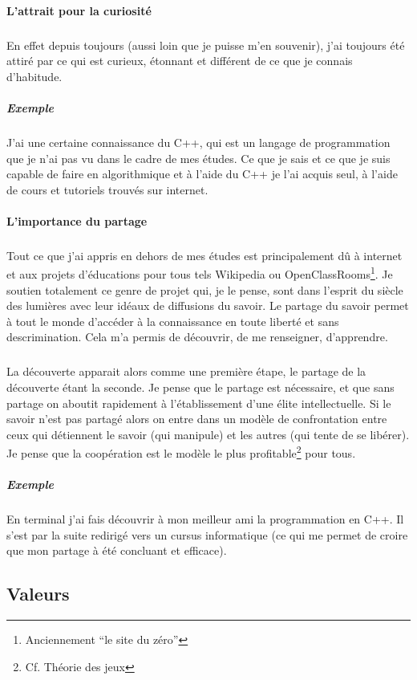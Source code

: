 \documentclass[a4paper,12pt, draft]{report}
\begin{document}
\paragraph{L'attrait pour la curiosité}
\subparagraph{}
En effet depuis toujours (aussi loin que je puisse m'en souvenir), j'ai toujours été attiré par ce qui est curieux, étonnant et différent de ce que je connais d'habitude.
\subparagraph{Exemple}
J'ai une certaine connaissance du C++, qui est un langage de programmation que je n'ai pas vu dans le cadre de mes études.  Ce que je sais et ce que je suis capable de faire en algorithmique et à l'aide du C++ je l'ai acquis seul, à l'aide de cours et tutoriels trouvés sur internet. 

 

\paragraph{L'importance du partage}
\subparagraph{}
Tout ce que j'ai appris en dehors de mes études est principalement dû à internet et aux projets d'éducations pour tous tels Wikipedia ou OpenClassRooms\footnote{Anciennement ``le site du zéro''}.
Je soutien totalement ce genre de projet qui, je le pense, sont dans l'esprit du siècle des lumières avec leur idéaux de diffusions du savoir. Le partage du savoir permet à tout le monde d'accéder à la connaissance en toute liberté et sans descrimination. Cela m'a permis de découvrir, de me renseigner, d'apprendre. 

\subparagraph{}
La découverte apparait alors comme une première étape, le partage de la découverte étant la seconde. Je pense que le partage est nécessaire, et que sans partage on aboutit rapidement  à l'établissement d'une élite intellectuelle. Si le savoir n'est pas partagé alors on entre dans un modèle de confrontation entre ceux qui détiennent le savoir (qui manipule) et les autres (qui tente de se libérer). Je pense que la coopération est le modèle le plus profitable\footnote{Cf. Théorie des jeux} pour tous.

\subparagraph{Exemple} En terminal j'ai fais découvrir à mon meilleur ami la programmation en C++. Il s'est par la suite redirigé vers un cursus informatique (ce qui me permet de croire que mon partage à été concluant et efficace).




\subsection{Valeurs}
\end{document}
